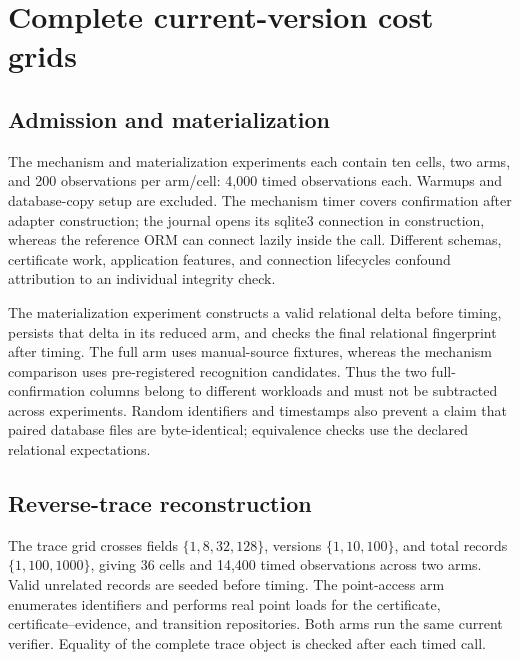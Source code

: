 \documentclass[preprint,12pt,authoryear]{elsarticle}
\begin{document}
\section{Complete current-version cost grids}
\label{app:cost-grids}

\subsection{Admission and materialization}

The mechanism and materialization experiments each contain ten cells, two arms, and 200 observations per arm/cell: 4,000 timed observations each. Warmups and database-copy setup are excluded. The mechanism timer covers confirmation after adapter construction; the journal opens its sqlite3 connection in construction, whereas the reference ORM can connect lazily inside the call. Different schemas, certificate work, application features, and connection lifecycles confound attribution to an individual integrity check.



The materialization experiment constructs a valid relational delta before timing, persists that delta in its reduced arm, and checks the final relational fingerprint after timing. The full arm uses manual-source fixtures, whereas the mechanism comparison uses pre-registered recognition candidates. Thus the two full-confirmation columns belong to different workloads and must not be subtracted across experiments. Random identifiers and timestamps also prevent a claim that paired database files are byte-identical; equivalence checks use the declared relational expectations.



\subsection{Reverse-trace reconstruction}

The trace grid crosses fields $\{1,8,32,128\}$, versions $\{1,10,100\}$, and total records $\{1,100,1000\}$, giving 36 cells and 14,400 timed observations across two arms. Valid unrelated records are seeded before timing. The point-access arm enumerates identifiers and performs real point loads for the certificate, certificate--evidence, and transition repositories. Both arms run the same current verifier. Equality of the complete trace object is checked after each timed call.
\end{document}
